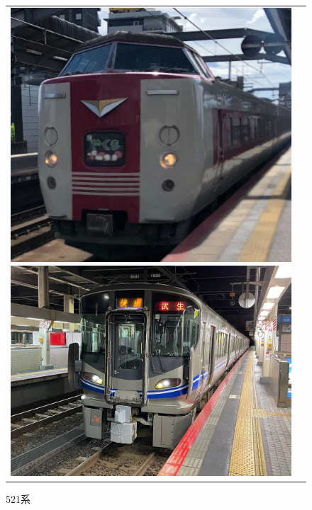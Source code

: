 \begin{figure}[htbp]
\begin{tabular}{cc}
\begin{minipage}[b]{0.15\textwidth}
			\includegraphics[width=\linewidth]{densya/381.jpg}
			\caption{381系}
			\label{fig:381}
		\end{minipage}
		\begin{minipage}[b]{0.15\textwidth}
			\includegraphics[width=\linewidth]{densya/521.jpg}
			\caption{521系}
			\label{fig:521}
		\end{minipage}
		\begin{minipage}[b]{0.15\textwidth}

\end{minipage}
\end{tabular}
\end{figure}
